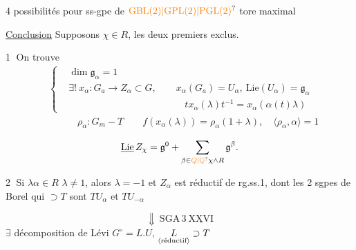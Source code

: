 
4 possibilités pour ss-gpe de $\unsure{\mathrm{GBL}(2)|\mathrm{GPL}(2)|\mathrm{PGL}(2)}$  tore maximal

\uline{Conclusion} Supposons $\chi\in R$, les deux premiers  exclus.

\textcircled{1} On trouve
\[
\begin{aligned}
&\left\{\begin{aligned}
 &\dim\mathfrak g_\alpha=1\\
 &\exists !\ x_\alpha:G_a\longrightarrow Z_\alpha\subset G,\qquad
 x_\alpha(G_a)=U_\alpha,\ \mathrm{Lie}(U_\alpha)=\mathfrak g_\alpha\\
 &\hspace{12em}t x_\alpha(\lambda)t^{-1}=x_\alpha(\alpha(t)\lambda)
\end{aligned}\right.\\
&\hspace{3em}\rho_\alpha:G_m\mathbin{-}T\qquad f(x_\alpha(\lambda))=\rho_\alpha(1+\lambda),\quad
 \langle\rho_\alpha,\alpha\rangle=1
\end{aligned}
\]

\[
\underline{\mathrm{Lie}}\, Z_\chi=\mathfrak g^{0}+
 \sum_{\beta\in\unsure{Q|\mathbb Q}\chi\mathbin{\wedge}R}\mathfrak g^\beta .
\]

\textcircled{2} Si $\lambda\alpha\in R$ \quad $\lambda\neq1$, alors $\lambda=-1$ et $Z_\alpha$ est réductif de rg.ss.1, dont les 2 sgpes de Borel qui $\supset T$ sont $TU_\alpha$ et $TU_{-\alpha}$

\[
\Downarrow\ \mathrm{SGA}\,3\ \underline{\mathrm{XXVI}}
\]
$\exists$ décomposition de Lévi \qquad $G^\circ=L.U$, \quad $\underset{\text{\inserted{réductif}}}{L}\supset T$

